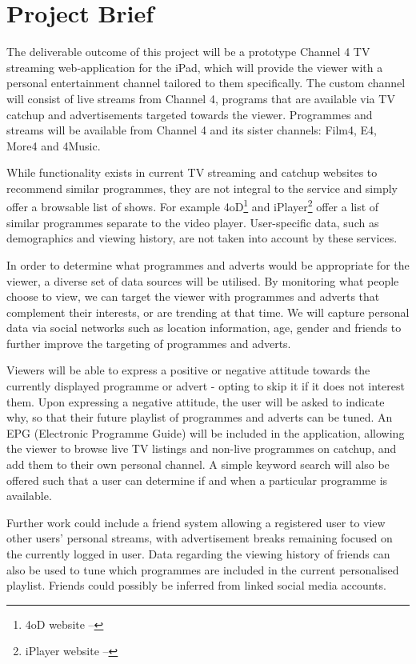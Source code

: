 \section{Project Brief}
\label{sec:appendix_brief}

The deliverable outcome of this project will be a prototype Channel 4 TV streaming web-application for the iPad, which will provide the viewer with a personal entertainment channel tailored to them specifically. The custom channel will consist of live streams from Channel 4, programs that are available via TV catchup and advertisements targeted towards the viewer. Programmes and streams will be available from Channel 4 and its sister channels: Film4, E4, More4 and 4Music.

While functionality exists in current TV streaming and catchup websites to recommend similar programmes, they are not integral to the service and simply offer a browsable list of shows. For example 4oD\footnote{4oD website -- } and iPlayer\footnote{iPlayer website -- } offer a list of similar programmes separate to the video player. User-specific data, such as demographics and viewing history, are not taken into account by these services.

In order to determine what programmes and adverts would be appropriate for the viewer, a diverse set of data sources will be utilised. By monitoring what people choose to view, we can target the viewer with programmes and adverts that complement their interests, or are trending at that time. We will capture personal data via social networks such as location information, age, gender and friends to further improve the targeting of programmes and adverts.

Viewers will be able to express a positive or negative attitude towards the currently displayed programme or advert - opting to skip it if it does not interest them. Upon expressing a negative attitude, the user will be asked to indicate why, so that their future playlist of programmes and adverts can be tuned. An EPG (Electronic Programme Guide) will be included in the application, allowing the viewer to browse live TV listings and non-live programmes on catchup, and add them to their own personal channel. A simple keyword search will also be offered such that a user can determine if and when a particular programme is available. 

Further work could include a friend system allowing a registered user to view other users' personal streams, with advertisement breaks remaining focused on the currently logged in user. Data regarding the viewing history of friends can also be used to tune which programmes are included in the current personalised playlist. Friends could possibly be inferred from linked social media accounts.

